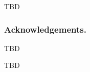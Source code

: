 \documentclass[russian,english]{llncs}
\begin{document}
TBD

\bigskip
\subsubsection*{Acknowledgements.}

TBD

%
%

\begin{thebibliography}{10}

TBD

\end{thebibliography}
\end{document}
